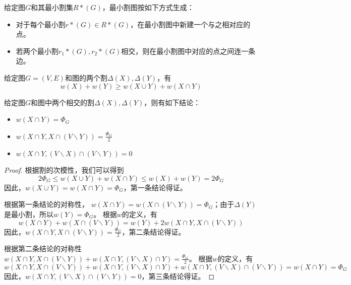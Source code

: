 \begin{definition}[最小割图]
  给定图$G$和其最小割集$R*(G)$，最小割图按如下方式生成：
  \begin{itemize}
    \item 对于每个最小割$r*(G)\in R*(G)$，在最小割图中新建一个与之相对应的点。
    \item 若两个最小割$r_1*(G),r_2*(G)$相交，则在最小割图中对应的点之间连一条边。
  \end{itemize}
\end{definition}

\begin{lemma}[割的次模性]\cite{cunningham1985minimum}
  给定图$G=(V,E)$和图的两个割$\Delta(X),\Delta(Y)$，有
  \begin{equation*}
    w(X)+w(Y)\geq w(X\cup Y)+w(X\cap Y)
  \end{equation*}
\end{lemma}

\begin{lemma}[次模性推论]
  给定图$G$和图中两个相交的割$\Delta(X),\Delta(Y)$，则有如下结论：
  \begin{itemize}
    \item $w(X\cap Y)=\Phi_G$
    \item $w(X\cap Y,X\cap (V\backslash Y))=\frac {\Phi_G}2$
    \item $w(X\cap Y,(V\backslash X)\cap (V\backslash Y))=0$
  \end{itemize}
\end{lemma}
\begin{proof}
  根据割的次模性，我们可以得到
  \begin{equation*}
    2\Phi_G\leq w(X\cup Y)+w(X\cap Y)\leq w(X)+w(Y) = 2\Phi_G
  \end{equation*}
  因此，$w(X\cup Y)=w(X\cap Y)=\Phi_G$，第一条结论得证。

  根据第一条结论的对称性，
  $w(X\cap Y)=w(X\cap (V\backslash Y))=\Phi_G$；由于$\Delta(Y)$是最小割，所以$w(Y)=\Phi_G$。
  根据$w$的定义，有
  \begin{equation*}
    w(X\cap Y)+w(X\cap (V\backslash Y))=w(Y)+2w(X\cap Y,X\cap (V\backslash Y))
  \end{equation*}
  因此，$w(X\cap Y,X\cap (V\backslash Y))=\frac {\Phi_G}2$，第二条结论得证。

  根据第二条结论的对称性$ w(X\cap Y,X\cap (V\backslash Y))+w(X\cap Y,(V\backslash X)\cap Y)=\frac{\Phi_G}2$。
  根据$w$的定义，有
  \begin{equation*}
    w(X\cap Y,X\cap (V\backslash Y))+w(X\cap Y,(V\backslash X)\cap Y)+w(X\cap Y,(V\backslash X)\cap (V\backslash Y))=w(X\cap Y)=\Phi_G
  \end{equation*}
  因此，$w(X\cap Y,(V\backslash X)\cap (V\backslash Y))=0$，第三条结论得证。
\end{proof}


